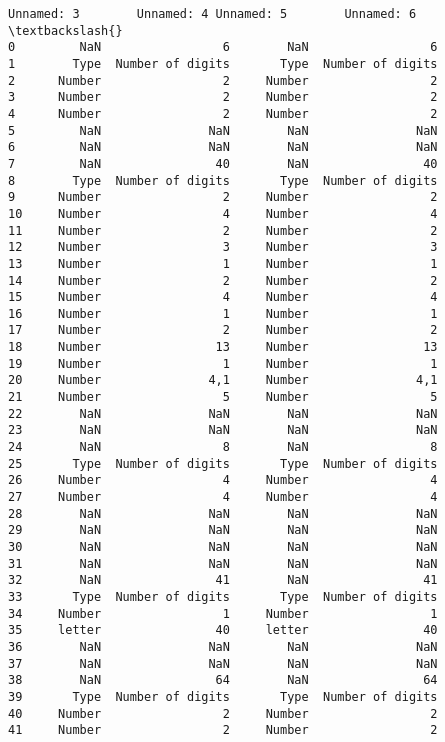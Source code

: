 \documentclass[11pt]{article}
\begin{document}
\begin{Verbatim}[commandchars=\\\{\}]
   Unnamed: 3        Unnamed: 4 Unnamed: 5        Unnamed: 6  \textbackslash{}
0         NaN                 6        NaN                 6
1        Type  Number of digits       Type  Number of digits
2      Number                 2     Number                 2
3      Number                 2     Number                 2
4      Number                 2     Number                 2
5         NaN               NaN        NaN               NaN
6         NaN               NaN        NaN               NaN
7         NaN                40        NaN                40
8        Type  Number of digits       Type  Number of digits
9      Number                 2     Number                 2
10     Number                 4     Number                 4
11     Number                 2     Number                 2
12     Number                 3     Number                 3
13     Number                 1     Number                 1
14     Number                 2     Number                 2
15     Number                 4     Number                 4
16     Number                 1     Number                 1
17     Number                 2     Number                 2
18     Number                13     Number                13
19     Number                 1     Number                 1
20     Number               4,1     Number               4,1
21     Number                 5     Number                 5
22        NaN               NaN        NaN               NaN
23        NaN               NaN        NaN               NaN
24        NaN                 8        NaN                 8
25       Type  Number of digits       Type  Number of digits
26     Number                 4     Number                 4
27     Number                 4     Number                 4
28        NaN               NaN        NaN               NaN
29        NaN               NaN        NaN               NaN
30        NaN               NaN        NaN               NaN
31        NaN               NaN        NaN               NaN
32        NaN                41        NaN                41
33       Type  Number of digits       Type  Number of digits
34     Number                 1     Number                 1
35     letter                40     letter                40
36        NaN               NaN        NaN               NaN
37        NaN               NaN        NaN               NaN
38        NaN                64        NaN                64
39       Type  Number of digits       Type  Number of digits
40     Number                 2     Number                 2
41     Number                 2     Number                 2

\end{Verbatim}
\end{document}
